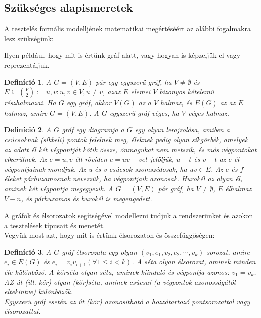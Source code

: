 \documentclass[12pt]{article}
\newtheorem{defin}{Definíció}[section]
\begin{document}
\subsection{Szükséges alapismeretek}

A tesztelés formális modelljének matematikai megértéséért az alábbi fogalmakra lesz szükségünk:

Ilyen például, hogy mit is értünk gráf alatt, vagy hogyan is képzeljük el vagy reprezentáljuk.\\

\begin{defin}
A $G = (V,E)$ pár egy egyszerü gráf, ha $V \neq \emptyset$ és $E \subseteq \binom{V}{2} := {{u,v} : u,v \in V, u \neq v}$, azaz $E$ elemei $V$ bizonyos kételemü részhalmazai. Ha $G$ egy gráf, akkor $V(G)$ az a $V$ halmaz, és $E(G)$ az az $E$ halmaz, amire $G = (V,E)$. A $G$ egyszerü gráf véges, ha $V$ véges halmaz. ~\cite{szam:Fleiner}
\end{defin}

\begin{defin}
A $G$ gráf egy diagramja a $G$ egy olyan lerajzolása, amiben a csúcsoknak (síkbeli) pontok felelnek meg, éleknek pedig olyan síkgörbék, amelyek az adott él két végpontját kötik össze, önmagukat nem metszik, és más végpontokat elkerülnek. Az $e = {u, v}$ élt röviden $e = uv-vel$ jelöljük, $u-t$ és $v-t$ az $e$ él végpontjainak mondjuk. Az u és v csúcsok szomszédosak, ha $uv \in E$. Az $e$ és $f$ éleket párhuzamosnak nevezzük, ha végpontjaik azonosak. Hurokél az olyan él, aminek két végpontja megegyezik. A $G = (V,E)$ pár gráf, ha $V \neq \emptyset$, $E$ élhalmaz $V-n$, és párhuzamos és hurokél is megengedett. ~\cite{szam:Fleiner}
\end{defin}

A gráfok és élsorozatok segítségével modellezni tudjuk a rendszerünket és azokon a tesztelések típusait és menetét.\\

Vegyük most azt, hogy mit is értünk élsorozaton és összefüggőségen:

\begin{defin}
A $G$ gráf élsorozata egy olyan $(v_1,e_1,v_2,e_2,\cdots,v_k)$ sorozat, amire $e_i \in E(G)$ és $e_i = v_iv_{i+1} (\forall 1 \leq i < k)$. A séta olyan élsorozat, aminek minden éle különböző. A körséta olyan séta, aminek kiinduló és végpontja azonos: $v_1 = v_k$. AZ út (ill. kör) olyan (kör)séta, aminek csúcsai (a végpontok azonosságától eltekintve) különbözők.\\
Egyszerü gráf esetén az út (kör) azonositható a hozzátartozó pontsorozattal vagy élsorozattal. ~\cite{szam:Fleiner}
\end{defin}
\end{document}
